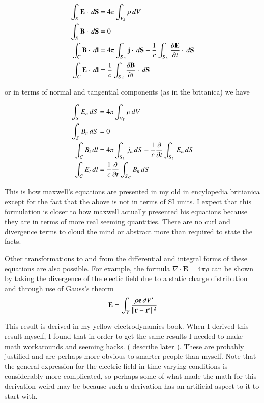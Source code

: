 \documentclass{article}      %
\newcommand{\norm}[1]{\lVert#1\rVert}
\newcommand{\Diverg}[1]{\nabla \cdot \mathbf{#1}}
\newcommand{\Ddt}[1]{ {{\partial{\mathbf{#1}}} \over {\partial{t}}}}
\newcommand{\Bj}[0]{\mathbf{j}}
\newcommand{\BB}[0]{\mathbf{B}}
\newcommand{\BE}[0]{\mathbf{E}}
\newcommand{\BS}[0]{\mathbf{S}}
\begin{document}
\begin{align*}
\int_{S} \BE \cdot \, d\BS &= 4\pi \int_{V_S} \rho\, dV \\
\int_{S} \BB \cdot \, d\BS &= 0 \\
\int_{C} \BB \cdot \, d\mathbf{l} &= 4\pi \int_{S_C} \Bj \cdot \, d\BS - {1 \over c} \int_{S_C} \Ddt{E} \cdot \, d\BS \\
\int_{C} \BE \cdot \, d\mathbf{l} &= {1 \over c} \int_{S_C} \Ddt{B} \cdot \, d\BS
\end{align*}

or in terms of normal and tangential components (as in the britanica) we have

\begin{align*}
\int_{S} E_n \, dS &= 4\pi \int_{V_S} \rho\, dV \\
\int_{S} B_n \, dS &= 0 \\
\int_{C} B_t \, dl &= 4\pi \int_{S_C} j_n \, dS - {1 \over c} {{\partial} \over {\partial t}} \int_{S_C} E_n \, dS \\
\int_{C} E_t \, dl &= {1 \over c} {{\partial} \over {\partial t}} \int_{S_C} B_n \, dS
\end{align*}

This is how 
maxwell's equations are presented in my old 
in encylopedia britianica 
except for the fact that 
the above is not in terms of SI units.  I expect that this formulation is closer to how 
maxwell actually presented his equations because they are in terms of more real 
seeming quantities.  There are no curl and divergence terms to cloud the mind or
abstract more than required to state the facts.

Other transformations to and from the differential and integral forms of these
equations are also possible.  For example, the formula $\Diverg E = 4\pi\rho$ 
can be shown by taking the divergence of the electic field due to a static
charge distribution and through use of Gauss's theorm
\begin{equation*}
\BE = \int_V{{\rho \mathbf{e}\,dV'} \over {\norm{\mathbf r - \mathbf r'}^2}}
\end{equation*}

This result is derived in my yellow electrodynamics book.  When I derived this
result myself, I found that in order to get the same results I needed to make
math workarounds and seeming hacks. ( describe later ).  These are probably 
justified and are perhaps more obvious to smarter people than myself.
Note that the general expression for the 
electric field in time varying conditions is considerably more complicated,
so perhaps some of what made the math for this derivation weird may be because
such a derivation has an artificial aspect to it to start with.
\end{document}
